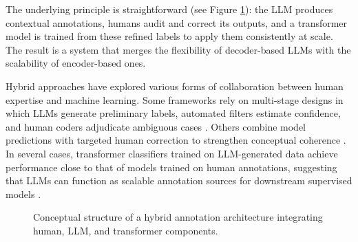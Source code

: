 \documentclass[12pt]{article}
\begin{document}
The underlying principle is straightforward (see Figure \ref{fig:hybrid_architecture}): the LLM produces contextual annotations, humans audit and correct its outputs, and a transformer model is trained from these refined labels to apply them consistently at scale. The result is a system that merges the flexibility of decoder-based LLMs with the scalability of encoder-based ones.

Hybrid approaches have explored various forms of collaboration between human expertise and machine learning. Some frameworks rely on multi-stage designs in which LLMs generate preliminary labels, automated filters estimate confidence, and human coders adjudicate ambiguous cases \parencite{wang_etal24a}. Others combine model predictions with targeted human correction to strengthen conceptual coherence \parencite{dreier_etal25}. In several cases, transformer classifiers trained on LLM-generated data achieve performance close to that of models trained on human annotations, suggesting that LLMs can function as scalable annotation sources for downstream supervised models \parencite{heseltineLargeLanguageModels2024, pangakisKnowledgeDistillationAutomated2024}. 

\begin{figure}[t!]
\centering
{}
\caption{Conceptual structure of a hybrid annotation architecture integrating human, LLM, and transformer components.}
\label{fig:hybrid_architecture}
\end{figure}
\end{document}
